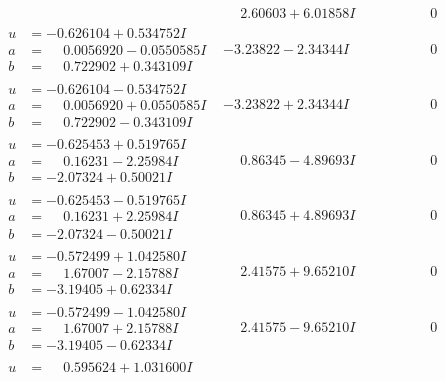 \documentclass[1p]{elsarticle_modified}
\theoremstyle{definition}
\begin{document}
$$\begin{array}{c|c|c}
 & \phantom{-}2.60603 + 6.01858 I & \phantom{-0.000000 } 0 \\ \hline\begin{aligned}
u &= -0.626104 + 0.534752 I \\
a &= \phantom{-}0.0056920 - 0.0550585 I \\
b &= \phantom{-}0.722902 + 0.343109 I\end{aligned}
 & -3.23822 - 2.34344 I & \phantom{-0.000000 } 0 \\ \hline\begin{aligned}
u &= -0.626104 - 0.534752 I \\
a &= \phantom{-}0.0056920 + 0.0550585 I \\
b &= \phantom{-}0.722902 - 0.343109 I\end{aligned}
 & -3.23822 + 2.34344 I & \phantom{-0.000000 } 0 \\ \hline\begin{aligned}
u &= -0.625453 + 0.519765 I \\
a &= \phantom{-}0.16231 - 2.25984 I \\
b &= -2.07324 + 0.50021 I\end{aligned}
 & \phantom{-}0.86345 - 4.89693 I & \phantom{-0.000000 } 0 \\ \hline\begin{aligned}
u &= -0.625453 - 0.519765 I \\
a &= \phantom{-}0.16231 + 2.25984 I \\
b &= -2.07324 - 0.50021 I\end{aligned}
 & \phantom{-}0.86345 + 4.89693 I & \phantom{-0.000000 } 0 \\ \hline\begin{aligned}
u &= -0.572499 + 1.042580 I \\
a &= \phantom{-}1.67007 - 2.15788 I \\
b &= -3.19405 + 0.62334 I\end{aligned}
 & \phantom{-}2.41575 + 9.65210 I & \phantom{-0.000000 } 0 \\ \hline\begin{aligned}
u &= -0.572499 - 1.042580 I \\
a &= \phantom{-}1.67007 + 2.15788 I \\
b &= -3.19405 - 0.62334 I\end{aligned}
 & \phantom{-}2.41575 - 9.65210 I & \phantom{-0.000000 } 0 \\ \hline\begin{aligned}
u &= \phantom{-}0.595624 + 1.031600 I \\

\end{aligned}
\end{array}$$
\end{document}
